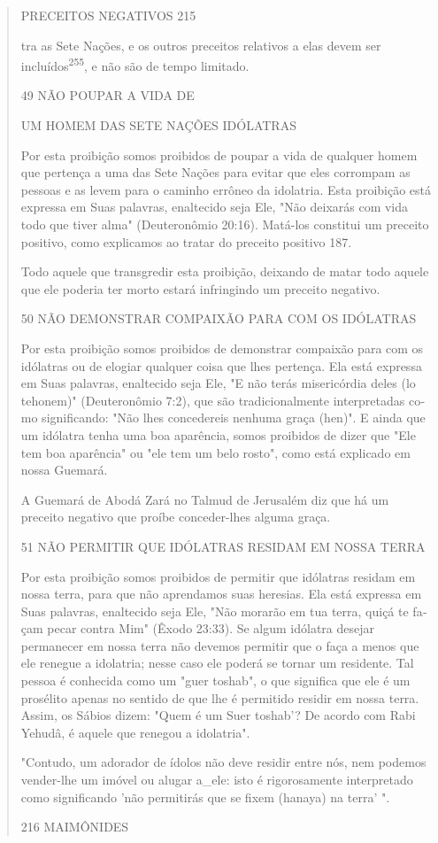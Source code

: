 \begin{quote}
PRECEITOS NEGATIVOS 215

tra as Sete Nações, e os outros preceitos relativos a elas devem ser
incluídos\textsuperscript{255}, e não são de tempo limitado.

49 NÃO POUPAR A VIDA DE

UM HOMEM DAS SETE NAÇÕES IDÓLATRAS

Por esta proibição somos proibidos de poupar a vida de qualquer homem
que pertença a uma das Sete Nações para evitar que eles corrompam as
pessoas e as levem para o caminho errôneo da idolatria. Esta proibição
está expressa em Suas palavras, enaltecido seja Ele, "Não deixarás com
vida todo que tiver alma" (Deuteronômio 20:16). Matá-los constitui um
preceito positi­vo, como explicamos ao tratar do preceito positivo 187.

Todo aquele que transgredir esta proibição, deixando de matar to­do
aquele que ele poderia ter morto estará infringindo um preceito
negativo.

50 NÃO DEMONSTRAR COMPAIXÃO PARA COM OS IDÓLATRAS

Por esta proibição somos proibidos de demonstrar compaixão para com os
idólatras ou de elogiar qualquer coisa que lhes pertença. Ela está
ex­pressa em Suas palavras, enaltecido seja Ele, "E não terás
misericórdia deles (lo tehonem)" (Deuteronômio 7:2), que são
tradicionalmente interpretadas co­mo significando: "Não lhes concedereis
nenhuma graça (hen)". E ainda que um idólatra tenha uma boa aparência,
somos proibidos de dizer que "Ele tem boa aparência" ou "ele tem um belo
rosto", como está explicado em nossa Guemará.

A Guemará de Abodá Zará no Talmud de Jerusalém diz que há um preceito
negativo que proíbe conceder-lhes alguma graça.

51 NÃO PERMITIR QUE IDÓLATRAS RESIDAM EM NOSSA TERRA

Por esta proibição somos proibidos de permitir que idólatras resi­dam em
nossa terra, para que não aprendamos suas heresias. Ela está expressa em
Suas palavras, enaltecido seja Ele, "Não morarão em tua terra, quiçá te
fa­çam pecar contra Mim" (Êxodo 23:33). Se algum idólatra desejar
permanecer em nossa terra não devemos permitir que o faça a menos que
ele renegue a idolatria; nesse caso ele poderá se tornar um residente.
Tal pessoa é conhecida como um "guer toshab", o que significa que ele é
um prosélito apenas no sen­tido de que lhe é permitido residir em nossa
terra. Assim, os Sábios dizem: "Quem é um Suer toshab'? De acordo com
Rabi Yehudâ, é aquele que rene­gou a idolatria".

"Contudo, um adorador de ídolos não deve residir entre nós, nem podemos
vender-lhe um imóvel ou alugar a\_ele: isto é rigorosamente
interpre­tado como significando 'não permitirás que se fixem (hanaya) na
terra' ".

216 MAIMÔNIDES
\end{quote}

